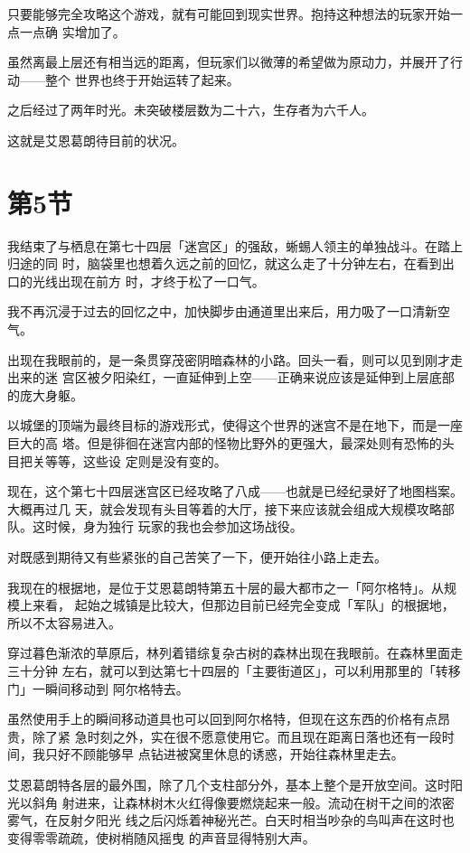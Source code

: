 \documentclass[11pt]{book}
\begin{document}
只要能够完全攻略这个游戏，就有可能回到现实世界。抱持这种想法的玩家开始一点一点确
实增加了。

虽然离最上层还有相当远的距离，但玩家们以微薄的希望做为原动力，并展开了行动——整个
世界也终于开始运转了起来。

之后经过了两年时光。未突破楼层数为二十六，生存者为六千人。

这就是艾恩葛朗待目前的状况。
\section{第5节}
\label{sec:org55cad22}
我结束了与栖息在第七十四层「迷宫区」的强敌，蜥蜴人领主的单独战斗。在踏上归途的同
时，脑袋里也想着久远之前的回忆，就这么走了十分钟左右，在看到出口的光线出现在前方
时，才终于松了一口气。

我不再沉浸于过去的回忆之中，加快脚步由通道里出来后，用力吸了一口清新空气。

出现在我眼前的，是一条贯穿茂密阴暗森林的小路。回头一看，则可以见到刚才走出来的迷
宫区被夕阳染红，一直延伸到上空——正确来说应该是延伸到上层底部的庞大身躯。

以城堡的顶端为最终目标的游戏形式，使得这个世界的迷宫不是在地下，而是一座巨大的高
塔。但是徘徊在迷宫内部的怪物比野外的更强大，最深处则有恐怖的头目把关等等，这些设
定则是没有变的。

现在，这个第七十四层迷宫区已经攻略了八成——也就是已经纪录好了地图档案。大概再过几
天，就会发现有头目等着的大厅，接下来应该就会组成大规模攻略部队。这时候，身为独行
玩家的我也会参加这场战役。

对既感到期待又有些紧张的自己苦笑了一下，便开始往小路上走去。

我现在的根据地，是位于艾恩葛朗特第五十层的最大都市之一「阿尔格特」。从规模上来看，
起始之城镇是比较大，但那边目前已经完全变成「军队」的根据地，所以不太容易进入。

穿过暮色渐浓的草原后，林列着错综复杂古树的森林出现在我眼前。在森林里面走三十分钟
左右，就可以到达第七十四层的「主要街道区」，可以利用那里的「转移门」一瞬间移动到
阿尔格特去。

虽然使用手上的瞬间移动道具也可以回到阿尔格特，但现在这东西的价格有点昂贵，除了紧
急时刻之外，实在很不愿意使用它。而且现在距离日落也还有一段时间，我只好不顾能够早
点钻进被窝里休息的诱惑，开始往森林里走去。

艾恩葛朗特各层的最外围，除了几个支柱部分外，基本上整个是开放空间。这时阳光以斜角
射进来，让森林树木火红得像要燃烧起来一般。流动在树干之间的浓密雾气，在反射夕阳光
线之后闪烁着神秘光芒。白天时相当吵杂的鸟叫声在这时也变得零零疏疏，使树梢随风摇曳
的声音显得特别大声。
\end{document}

